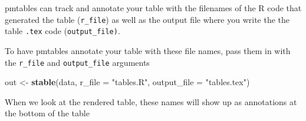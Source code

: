 \documentclass[
]{book}
\newenvironment{Shaded}{\begin{snugshade}}{\end{snugshade}}
\newcommand{\DataTypeTok}[1]{\textcolor[rgb]{0.13,0.29,0.53}{#1}}
\newcommand{\KeywordTok}[1]{\textcolor[rgb]{0.13,0.29,0.53}{\textbf{#1}}}
\newcommand{\NormalTok}[1]{#1}
\newcommand{\OperatorTok}[1]{\textcolor[rgb]{0.81,0.36,0.00}{\textbf{#1}}}
\newcommand{\StringTok}[1]{\textcolor[rgb]{0.31,0.60,0.02}{#1}}
\begin{document}
pmtables can track and annotate your table with the filenames of the
R code that generated the table (\texttt{r\_file}) as well as the output file
where you write the the table \texttt{.tex} code (\texttt{output\_file)}.

To have pmtables annotate your table with these file names, pass them
in with the \texttt{r\_file} and \texttt{output\_file} arguments

\begin{Shaded}
\begin{Highlighting}[]
\NormalTok{out <-}\StringTok{ }\KeywordTok{stable}\NormalTok{(data, }\DataTypeTok{r_file =} \StringTok{"tables.R"}\NormalTok{, }\DataTypeTok{output_file =} \StringTok{"tables.tex"}\NormalTok{)}
\end{Highlighting}
\end{Shaded}

When we look at the rendered table, these names will show up as annotations
at the bottom of the table

\begin{Shaded}
\end{Shaded}
\end{document}

